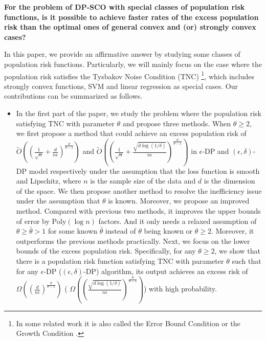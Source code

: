 \documentclass[12pt]{alt2022} %
\renewcommand{\tilde}{\widetilde}
\begin{document}
{\bf For the problem of DP-SCO with  special classes of population risk functions, is it possible to achieve faster rates of the excess population risk than the optimal ones of general convex and (or) strongly convex cases? }

In this paper, we provide an affirmative answer by studying some classes of population risk functions. Particularly, we will mainly focus on the case where the population risk satisfies the Tysbakov Noise Condition (TNC) \footnote{In some related work it is also called the Error Bound Condition  or the Growth Condition \citep{liu2018fast,xu2017stochastic}.}, which includes strongly convex functions, SVM and linear regression as special cases. Our contributions can be summarized as follows. 
\begin{itemize}
    \item In the first part of the paper, we study the problem where the population risk satisfying TNC with parameter $\theta$ and propose three methods. When $\theta\geq 2$, we first propose a method that could achieve an excess population risk of $\tilde{O}((\frac{1}{\sqrt{n}}+\frac{d}{n\epsilon})^\frac{\theta}{\theta-1}) $ and $\tilde{O}((\frac{1}{\sqrt{n}}+\frac{\sqrt{d\log(1/\delta)}}{n\epsilon})^\frac{\theta}{\theta-1})$ in $\epsilon$-DP and $(\epsilon, \delta)$-DP model respectively under the assumption that the loss function is smooth and Lipschitz,  where $n$ is the sample size of the data and $d$ is the dimension of the space. We then propose another method to resolve the inefficiency issue under the assumption that $\theta$ is known. Moreover, we propose an improved method. Compared with previous two methods, it improves the upper bounds of error by $\text{Poly}(\log n)$ factors. And it only needs a relaxed assumption of $\theta\geq \bar{\theta}>1$ for some known $\bar{\theta}$ instead of $\theta$ being known or $\theta\geq 2$. Moreover, it outperforms the previous methods practically. Next, we focus on the lower bounds of the excess population risk. Specifically, for any $\theta\geq 2$, we show that there is a population risk function satisfying TNC with parameter $\theta$ such that for any $\epsilon$-DP ($(\epsilon, \delta)$-DP) algorithm, its output achieves an excess risk of  $\Omega((\frac{d}{n\epsilon})^\frac{\theta}{\theta-1}) $ ( $\Omega((\frac{\sqrt{d\log(1/\delta)}}{n\epsilon})^\frac{\theta}{\theta-1})$) with high probability.

\end{itemize}
\end{document}
